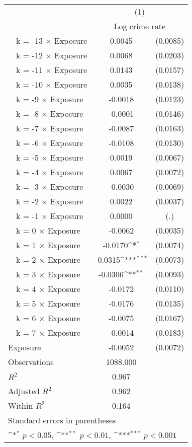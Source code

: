 {
\def\sym#1{\ifmmode^{#1}\else\(^{#1}\)\fi}
\begin{tabular}{l*{1}{cc}}
\toprule
                &\multicolumn{2}{c}{(1)}     \\
                &\multicolumn{2}{c}{Log crime rate}\\
\midrule
~~k = -13 $\times$ Exposure&   0.0045         & (0.0085)\\
~~k = -12 $\times$ Exposure&   0.0068         & (0.0203)\\
~~k = -11 $\times$ Exposure&   0.0143         & (0.0157)\\
~~k = -10 $\times$ Exposure&   0.0035         & (0.0138)\\
~~k = -9 $\times$ Exposure&  -0.0018         & (0.0123)\\
~~k = -8 $\times$ Exposure&  -0.0001         & (0.0146)\\
~~k = -7 $\times$ Exposure&  -0.0087         & (0.0163)\\
~~k = -6 $\times$ Exposure&  -0.0108         & (0.0130)\\
~~k = -5 $\times$ Exposure&   0.0019         & (0.0067)\\
~~k = -4 $\times$ Exposure&   0.0067         & (0.0072)\\
~~k = -3 $\times$ Exposure&  -0.0030         & (0.0069)\\
~~k = -2 $\times$ Exposure&   0.0022         & (0.0037)\\
~~k = -1 $\times$ Exposure&   0.0000         &      (.)\\
~~k = 0 $\times$ Exposure&  -0.0062         & (0.0035)\\
~~k = 1 $\times$ Exposure&  -0.0170\sym{*}  & (0.0074)\\
~~k = 2 $\times$ Exposure&  -0.0315\sym{***}& (0.0073)\\
~~k = 3 $\times$ Exposure&  -0.0306\sym{**} & (0.0093)\\
~~k = 4 $\times$ Exposure&  -0.0172         & (0.0110)\\
~~k = 5 $\times$ Exposure&  -0.0176         & (0.0135)\\
~~k = 6 $\times$ Exposure&  -0.0075         & (0.0167)\\
~~k = 7 $\times$ Exposure&  -0.0014         & (0.0183)\\
Exposure        &  -0.0052         & (0.0072)\\
\midrule
Observations    & 1088.000         &         \\
\(R^{2}\)       &    0.967         &         \\
Adjusted \(R^{2}\)&    0.962         &         \\
Within \(R^{2}\)&    0.164         &         \\
\bottomrule
\multicolumn{3}{l}{\footnotesize Standard errors in parentheses}\\
\multicolumn{3}{l}{\footnotesize \sym{*} \(p<0.05\), \sym{**} \(p<0.01\), \sym{***} \(p<0.001\)}\\
\end{tabular}
}
